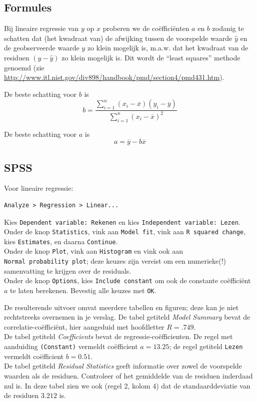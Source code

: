 \documentclass[
]{book}
\begin{document}
\hypertarget{sec:regressie-formules}{%
\subsection{Formules}\label{sec:regressie-formules}}

Bij lineaire regressie van \(y\) op \(x\) proberen we de coëfficiënten \(a\)
en \(b\) zodanig te schatten dat (het kwadraat van) de afwijking tussen de
voorspelde waarde \(\hat{y}\) en de geobserveerde waarde \(y\) zo klein
mogelijk is, m.a.w. dat het kwadraat van de residuen \((y-\hat{y})\) zo
klein mogelijk is. Dit wordt de ``least squares'' methode genoemd (zie
\url{http://www.itl.nist.gov/div898/handbook/pmd/section4/pmd431.htm}).

De beste schatting voor \(b\) is
\[b = \frac{ \sum_{i=1}^n (x_i-\overline{x})(y_i-\overline{y}) } { \sum_{i=1}^n (x_i-\overline{x})^2 }\]

De beste schatting voor \(a\) is \[a = \overline{y} - b \overline{x}\]

\hypertarget{spss-6}{%
\subsection{SPSS}\label{spss-6}}

Voor lineaire regressie:

\begin{verbatim}
Analyze > Regression > Linear...
\end{verbatim}

Kies \texttt{Dependent\ variable:\ Rekenen} en kies
\texttt{Independent\ variable:\ Lezen}. Onder de knop \texttt{Statistics}, vink aan
\texttt{Model\ fit}, vink aan \texttt{R\ squared\ change}, kies \texttt{Estimates}, en daarna
\texttt{Continue}.\\
Onder de knop \texttt{Plot}, vink aan \texttt{Histogram} en vink ook aan
\texttt{Normal\ probability\ plot}; deze keuzes zijn vereist om een numerieke(!)
samenvatting te krijgen over de residuals.\\
Onder de knop \texttt{Options}, kies \texttt{Include\ constant} om ook de constante
coëfficiënt \(a\) te laten berekenen. Bevestig alle keuzes met \texttt{OK}.

De resulterende uitvoer omvat meerdere tabellen en figuren; deze kan je
niet rechtstreeks overnemen in je verslag. De tabel getiteld \emph{Model
Summary} bevat de correlatie-coëfficiënt, hier aangeduid met hoofdletter
\(R=.749\).\\
De tabel getiteld \emph{Coefficients} bevat de regressie-coëfficienten. De
regel met aanduiding \texttt{(Constant)} vermeldt coëfficient \(a=13.25\); de
regel getiteld \texttt{Lezen} vermeldt coëfficient \(b=0.51\).\\
De tabel getiteld \emph{Residual Statistics} geeft informatie over zowel de
voorspelde waarden als de residuen. Controleer of het gemiddelde van de
residuen inderdaad nul is. In deze tabel zien we ook (regel 2, kolom 4)
dat de standaarddeviatie van de residuen \(3.212\) is.
\end{document}
